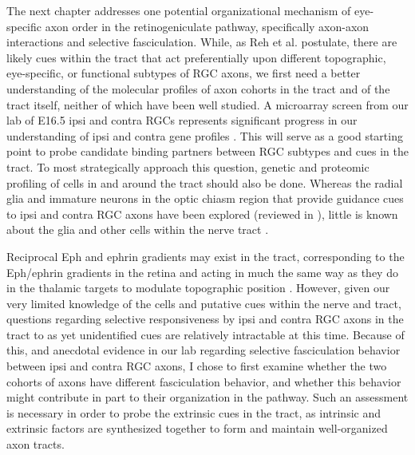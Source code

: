The next chapter addresses one potential organizational mechanism of eye-specific axon order in the retinogeniculate pathway, specifically axon-axon interactions and selective fasciculation.
While, as Reh et al.  postulate, there are likely cues within the tract that act preferentially upon different topographic, eye-specific, or functional subtypes of RGC axons, we first need a better understanding of the molecular profiles of axon cohorts in the tract and of the tract itself, neither of which have been well studied.
A microarray screen from our lab of E16.5 ipsi and contra RGCs represents significant progress in our understanding of ipsi and contra gene profiles \cite{wang2016ipsilateral}.
This will serve as a good starting point to probe candidate binding partners between RGC subtypes and cues in the tract.
To most strategically approach this question, genetic and proteomic profiling of cells in and around the tract should also be done.
Whereas the radial glia and immature neurons in the optic chiasm region that provide guidance cues to ipsi and contra RGC axons have been explored (reviewed in ), little is known about the glia and other cells within the nerve tract \cite{guillery1987changing,colello1992observations}.

Reciprocal Eph and ephrin gradients may exist in the tract, corresponding to the Eph/ephrin gradients in the retina and acting in much the same way as they do in the thalamic targets to modulate topographic position \cite{mclaughlin2005molecular,flanagan2006neural,feldheim2010visual}.
However, given our very limited knowledge of the cells and putative cues within the nerve and tract, questions regarding selective responsiveness by ipsi and contra RGC axons in the tract to as yet unidentified cues are relatively intractable at this time.
Because of this, and anecdotal evidence in our lab regarding selective fasciculation behavior between ipsi and contra RGC axons, I chose to first examine whether the two cohorts of axons have different fasciculation behavior, and whether this behavior might contribute in part to their organization in the pathway.
Such an assessment is necessary in order to probe the extrinsic cues in the tract, as intrinsic and extrinsic factors are synthesized together to form and maintain well-organized axon tracts.